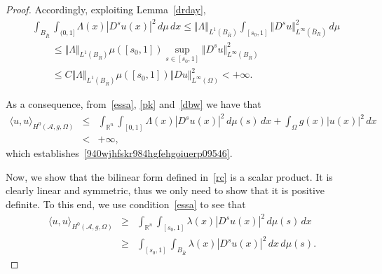 \documentclass[11pt,hyp,]{nyjm}
\numberwithin{equation}{section}
\newcommand{\R}{\mathbb{R}}
\theoremstyle{remark}
\renewcommand{\leq}{\leqslant}
\renewcommand{\ge}{\geqslant}
\begin{document}
\begin{proof}
Accordingly,
exploiting Lemma~\ref{drday},
\begin{equation}\begin{split}\label{dbw}&
\int_{B_{\overline R}} \int_{(0,1]} \Lambda(x) |D^s u(x)|^2  \, d\mu \, dx \leq \Vert \Lambda \Vert_{L^1(B_{\overline R})} \int_{[s_0,1]} \Vert D^s u \Vert^2_{L^{\infty}(\overline B_R)} \, d\mu \\ &\qquad
\leq \Vert \Lambda \Vert_{L^1(B_{\overline R})}\mu([s_0,1]) \sup_{s \in [s_0,1]}\Vert D^s u \Vert^2_{L^{\infty}(B_{\overline R})}\\&\qquad \leq C \Vert \Lambda \Vert_{L^1(B_{\overline R})} \mu([s_0,1])
\Vert Du \Vert^2_{L^{\infty}(\Omega)} < + \infty.\end{split}\end{equation}

As a consequence, from~\eqref{essa}, \eqref{pk} and~\eqref{dbw} we have that
\begin{eqnarray*}
\langle u, u \rangle_{H^{0}(\mathcal{A}, g, \Omega)} &\leq&  \int_{ \R^n  } \int_{[0,1]} \Lambda(x) |D^s u(x)|^2  \, d\mu (s)\, dx + \int_{\Omega} g (x)|u(x)|^2 \, dx \\&< &+ \infty ,
\end{eqnarray*}
which establishes~\eqref{940wjhfskr984hgfehgoiuerp09546}.

{N}ow, we show that the bilinear form defined in~\eqref{rc} is a scalar product. It is clearly linear and symmetric, thus we only need to show that it is positive definite. To this end, we use condition~\eqref{essa} to see that
\begin{eqnarray*} \langle u, u \rangle_{H^{0}(\mathcal{A}, g, \Omega)}&\ge&
\int_{\R^n}\int_{[s_0,1]}  \lambda(x) |D^su(x)|^2\, d\mu(s) \, dx\\&
\ge&  \int_{[s_0,1]}\int_{B_{\overline R}}  \lambda(x) |D^su(x)|^2 \, dx\, d\mu(s).\end{eqnarray*}


\end{proof}
\end{document}
